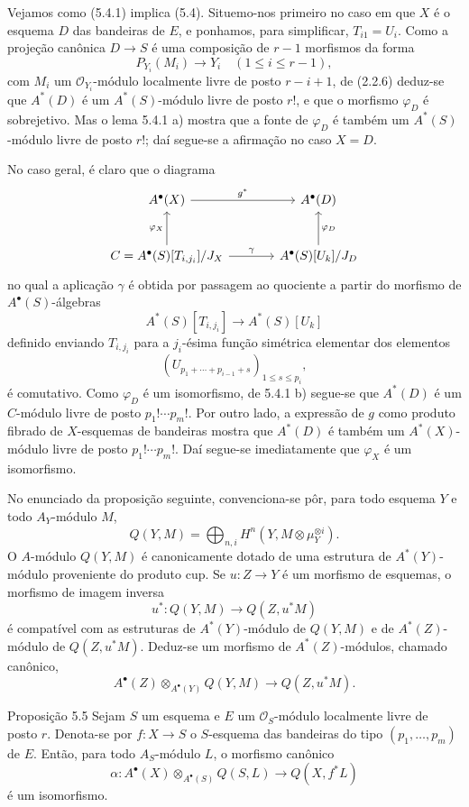 Vejamos como (5.4.1) implica (5.4). Situemo-nos primeiro no caso em que $X$ é o esquema $D$ das bandeiras de $E$, e ponhamos, para simplificar, $T_{i1}=U_i$. Como a projeção canônica $D\to S$ é uma composição de $r-1$ morfismos da forma
\[
P_{Y_i}(M_i)\to Y_i\quad(1\le i\le r-1),
\]
com $M_i$ um $\mathcal O_{Y_i}$-módulo localmente livre de posto $r-i+1$, de (2.2.6) deduz-se que $A^*(D)$ é um $A^*(S)$-módulo livre de posto $r!$, e que o morfismo $\varphi_D$ é sobrejetivo. Mas o lema 5.4.1 a) mostra que a fonte de $\varphi_D$ é também um $A^*(S)$-módulo livre de posto $r!$; daí segue-se a afirmação no caso $X=D$.

No caso geral, é claro que o diagrama
\[
\begin{tikzcd}[column sep=large,row sep=large]
A^{\bullet}(X) \arrow[r,"g^*"] & A^{\bullet}(D)\\
C=A^{\bullet}(S)[T_{i,j_i}]/J_X \arrow[u,"\varphi_X"] \arrow[r,"\gamma"] &
A^{\bullet}(S)[U_k]/J_D \arrow[u,"\varphi_D"']
\end{tikzcd}
\]
no qual a aplicação $\gamma$ é obtida por passagem ao quociente a partir do morfismo de $A^{\bullet}(S)$-álgebras
\[
A^*(S)[T_{i,j_i}]\to A^*(S)[U_k]
\]
definido enviando $T_{i,j_i}$ para a $j_i$-ésima função simétrica elementar dos elementos
\[
(U_{p_1+\cdots+p_{i-1}+s})_{1\le s\le p_i},
\]
é comutativo. Como $\varphi_D$ é um isomorfismo, de 5.4.1 b) segue-se que $A^*(D)$ é um $C$-módulo livre de posto $p_1!\cdots p_m!$. Por outro lado, a expressão de $g$ como produto fibrado de $X$-esquemas de bandeiras mostra que $A^*(D)$ é também um $A^*(X)$-módulo livre de posto $p_1!\cdots p_m!$. Daí segue-se imediatamente que $\varphi_X$ é um isomorfismo.

No enunciado da proposição seguinte, convenciona-se pôr, para todo esquema $Y$ e todo $A_Y$-módulo $M$,
\[
Q(Y,M)=\bigoplus_{n,i}H^n(Y,M\otimes\mu_Y^{\otimes i}).
\]
O $A$-módulo $Q(Y,M)$ é canonicamente dotado de uma estrutura de $A^*(Y)$-módulo proveniente do produto cup. Se $u:Z\to Y$ é um morfismo de esquemas, o morfismo de imagem inversa
\[
u^*:Q(Y,M)\to Q(Z,u^*M)
\]
é compatível com as estruturas de $A^*(Y)$-módulo de $Q(Y,M)$ e de $A^*(Z)$-módulo de $Q(Z,u^*M)$. Deduz-se um morfismo de $A^*(Z)$-módulos, chamado canônico,
\[
A^\bullet(Z)\otimes_{A^\bullet(Y)}Q(Y,M)\to Q(Z,u^*M).
\]

\begin{statement}{Proposição 5.5}
Sejam $S$ um esquema e $E$ um $\mathcal O_S$-módulo localmente livre de posto $r$. Denota-se por $f:X\to S$ o $S$-esquema das bandeiras do tipo $(p_1,\ldots,p_m)$ de $E$. Então, para todo $A_S$-módulo $L$, o morfismo canônico
\[
\alpha:A^\bullet(X)\otimes_{A^\bullet(S)}Q(S,L)\to Q(X,f^*L)
\]
é um isomorfismo.
\end{statement}

